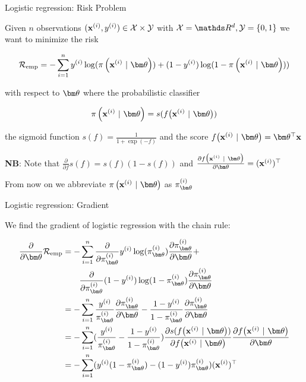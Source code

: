 \documentclass[11pt,compress,t,notes=noshow, xcolor=table]{beamer}
\begin{document}

\begin{frame}{Logistic regression: Risk Problem}

Given $n$ observations $(\mathbf{x}^{(i)}, y^{(i)}) \in \mathcal{X} \times \mathcal{Y}$ with  $\Xspace = \R^d, \Yspace = \setzo$ we want to minimize the risk 

$$
\riske   = 
-\sum^n_{i=1} \yi\log(\pixit) + (1-\yi)\log(1-\pixit))
$$

with respect to $\thetav$ where the probabilistic classifier

$$
\pixit = s(\fxit)
$$

the sigmoid function $s(f) = \frac{1}{1 + \exp(-f)}$ and the score $\fxit = \thx$

\vfill

\textbf{NB}: Note that $\frac{\partial}{\partial f} s(f) = s(f)(1-s(f))$ and $\frac{\partial \fxit}{\partial \thetav} = (\xi)^\top$\\

\vfill

From now on we abbreviate $\pixit$ as $\pi^{(i)}_{\thetav}$

\end{frame}

\begin{frame}{Logistic regression: Gradient}

We find the gradient of logistic regression with the chain rule:

\vfill

{\small
\begin{align*}
\frac{\partial}{\partial\thetav}\riske  & =  
-\sumin \frac{\partial}{\partial \pi^{(i)}_{\thetav}  }\yi\log( \pi^{(i)}_{\thetav} )\frac{\partial \pi^{(i)}_{\thetav} }{\partial \thetav} +  \\
& \qquad \frac{\partial}{\partial \pi^{(i)}_{\thetav} } (1-\yi)\log(1- \pi^{(i)}_{\thetav} )\frac{\partial \pi^{(i)}_{\thetav} }{\partial \thetav}\\
& =  
-\sumin \frac{\yi}{ \pi^{(i)}_{\thetav} }\frac{\partial \pi^{(i)}_{\thetav} }{\partial \thetav} -  \frac{1-\yi}{1- \pi^{(i)}_{\thetav} }\frac{\partial \pi^{(i)}_{\thetav} }{\partial \thetav}\\
&=  
-\sumin (\frac{\yi}{ \pi^{(i)}_{\thetav} } -  \frac{1-\yi}{1- \pi^{(i)}_{\thetav} })\frac{\partial s(\fxit)}{\partial  \fxit}\frac{\partial  \fxit}{\partial\thetav}\\
&=  
-\sum^n_{i=1} (\yi(1- \pi^{(i)}_{\thetav} )  -  (1-\yi) \pi^{(i)}_{\thetav}  )(\xi)^\top\\
\end{align*}
}


\end{frame}
\end{document}
